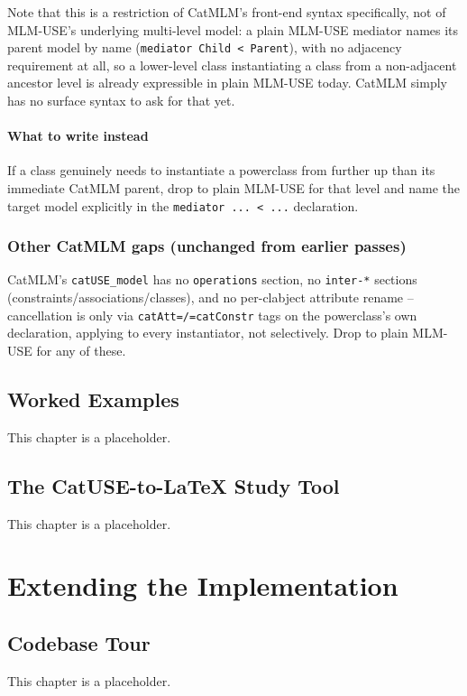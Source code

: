\documentclass[11pt,twoside,a4paper]{book}
\begin{document}
Note that this is a restriction of CatMLM's front-end syntax specifically,
not of MLM-USE's underlying multi-level model: a plain MLM-USE mediator
names its parent model by name (\texttt{mediator Child < Parent}), with no
adjacency requirement at all, so a lower-level class instantiating a
class from a non-adjacent ancestor level is already expressible in plain
MLM-USE today. CatMLM simply has no surface syntax to ask for that yet.

\subsection{What to write instead}
\label{sec:org6777e53}

If a class genuinely needs to instantiate a powerclass from further up
than its immediate CatMLM parent, drop to plain MLM-USE for that level
and name the target model explicitly in the \texttt{mediator ... < ...}
declaration.

\section{Other CatMLM gaps (unchanged from earlier passes)}
\label{sec:orgfc2da1e}

CatMLM's \texttt{catUSE\_model} has no \texttt{operations} section, no \texttt{inter-*}
sections (constraints/associations/classes), and no per-clabject
attribute rename -- cancellation is only via \texttt{catAtt=/=catConstr} tags on
the powerclass's own declaration, applying to every instantiator, not
selectively. Drop to plain MLM-USE for any of these.
\chapter{Worked Examples}
\label{sec:org122036d}
This chapter is a placeholder.
\chapter{The CatUSE-to-\LaTeX{} Study Tool}
\label{sec:orgbc5b501}
This chapter is a placeholder.
\part{Extending the Implementation}
\label{sec:org24bb1c9}
\chapter{Codebase Tour}
\label{sec:orgc736412}
This chapter is a placeholder.
\end{document}
